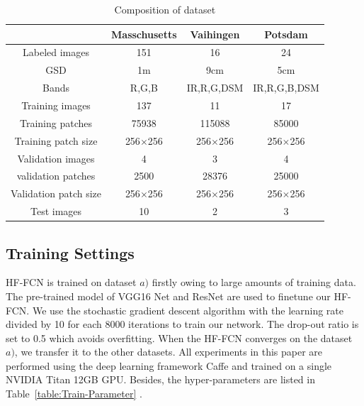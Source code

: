 \begin{table}
 \centering
 \caption{Composition of dataset}
 \label{table:dataset-composition}
 \begin{tabular}{c|ccc}
\hline
& Masschusetts & Vaihingen & Potsdam\\  \hline
Labeled images & 151& 16 &24\\ \hline
GSD & 1m & 9cm & 5cm\\ \hline
Bands & R,G,B & IR,R,G,DSM & IR,R,G,B,DSM\\ \hline
Training images &137 & 11 & 17\\ \hline
Training patches&75938 &115088 &85000\\ \hline
Training patch size& 256$\times$256 & 256$\times$256 & 256$\times$256\\ \hline
Validation images & 4 & 3 & 4\\ \hline
validation patches &2500 & 28376 &25000 \\\hline
Validation patch size & 256$\times$256 & 256$\times$256 & 256$\times$256\\ \hline
Test images & 10 & 2 & 3\\ \hline
\end{tabular}
\end {table}



\subsection{Training Settings}
HF-FCN is trained on dataset ${a)}$ firstly owing to large amounts of training data. The pre-trained model of VGG16 Net and ResNet are used to finetune our HF-FCN. We use the stochastic gradient descent algorithm with the learning rate divided by 10 for each 8000 iterations to train our network. The drop-out ratio is set to 0.5 which avoids overfitting. When the HF-FCN converges on the dataset ${a)}$, we transfer it to the other datasets. All experiments in this paper are performed using the deep learning framework Caffe and trained on a single NVIDIA Titan 12GB GPU. Besides, the hyper-parameters are listed in Table~\ref{table:Train-Parameter} .

